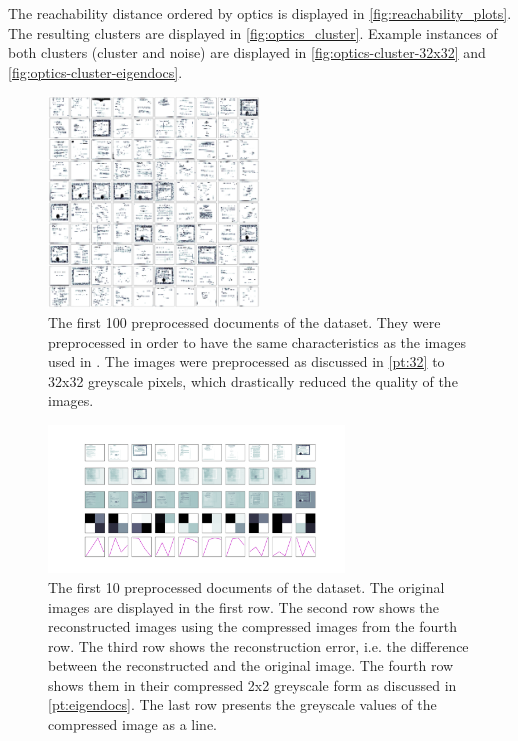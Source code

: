 The reachability distance ordered by \ac{optics} is displayed in \autoref{fig:reachability_plots}.
The resulting clusters are displayed in \autoref{fig:optics_cluster}.
Example instances of both clusters (cluster and noise) are displayed in \autoref{fig:optics-cluster-32x32} and \autoref{fig:optics-cluster-eigendocs}.

\begin{figure}[htp] %
    \centering
    \includegraphics[width=0.5\textwidth]{images/OPTICS/32x32/preprocessed_docs.pdf}
    \caption{The first 100 preprocessed documents of the dataset.
    They were preprocessed in order to have the same characteristics as the images used in \cite{OPTICS1999}.
    The images were preprocessed as discussed in \autoref{pt:32} to 32x32 greyscale pixels, which drastically reduced the quality of the images.
    }
    \label{fig:preprocessed_docs_32x32}
\end{figure}

\begin{figure}[htp] %
    \centering
    \includegraphics[width=0.7\textwidth]{images/OPTICS/eigendocs/eigendocs_2x2_dim.pdf}
    \caption{The first 10 preprocessed documents of the dataset.
    The original images are displayed in the first row.
    The second row shows the reconstructed images using the compressed images from the fourth row.
    The third row shows the reconstruction error, i.e. the difference between the reconstructed and the original image.
    The fourth row shows them in their compressed 2x2 greyscale form as discussed in \autoref{pt:eigendocs}.
    The last row presents the greyscale values of the compressed image as a line.
    }
    \label{fig:preprocessed_docs_eigendocs}
\end{figure}


